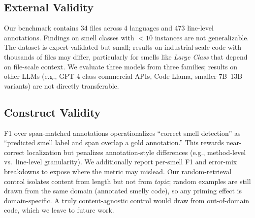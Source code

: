 \documentclass[conference]{IEEEtran}
\begin{document}
\subsection{External Validity}
Our benchmark contains 34 files across 4 languages and 473 line-level
annotations. Findings on smell classes with $<10$ instances are not
generalizable. The dataset is expert-validated but small; results on
industrial-scale code with thousands of files may differ, particularly for
smells like \textit{Large Class} that depend on file-scale context. We
evaluate three models from three families; results on other LLMs (e.g.,
GPT-4-class commercial APIs, Code Llama, smaller 7B--13B variants) are not
directly transferable.

\subsection{Construct Validity}
F1 over span-matched annotations operationalizes ``correct smell detection''
as ``predicted smell label and span overlap a gold annotation.'' This rewards
near-correct localization but penalizes annotation-style differences (e.g.,
method-level vs.\ line-level granularity). We additionally report per-smell F1
and error-mix breakdowns to expose where the metric may mislead. Our
random-retrieval control isolates content from length but not from
\emph{topic}; random examples are still drawn from the same domain (annotated
smelly code), so any priming effect is domain-specific. A truly
content-agnostic control would draw from out-of-domain code, which we leave
to future work.
\end{document}

